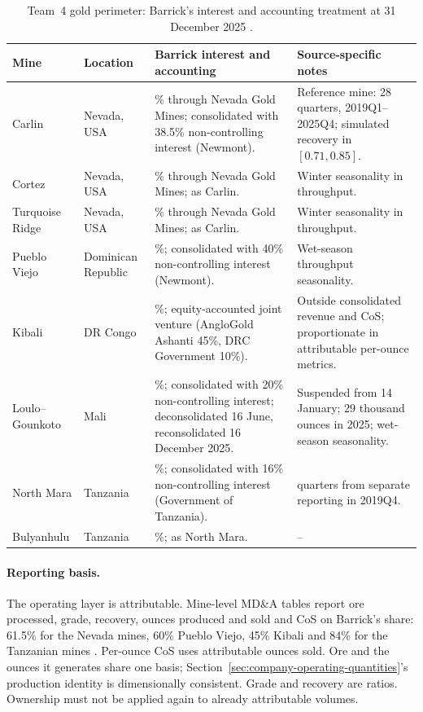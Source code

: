 \begin{table}[H]
\centering
\caption{Team~4 gold perimeter: Barrick's interest and accounting treatment
at 31 December 2025 \cite{team4,barrick-ar-2025}.}
\label{tab:company-operating-perimeter}
\small
\renewcommand{\arraystretch}{1.12}
\begin{tabularx}{\textwidth}{@{}>{\raggedright\arraybackslash}p{2.15cm}%
>{\raggedright\arraybackslash}p{1.75cm}%
>{\raggedright\arraybackslash}p{3.85cm}%
>{\raggedright\arraybackslash}X@{}}
\toprule
\textbf{Mine} & \textbf{Location} & \textbf{Barrick interest and accounting}
& \textbf{Source-specific notes} \\
\midrule
Carlin & Nevada, USA & 61.5\% through Nevada Gold Mines; consolidated with
38.5\% non-controlling interest (Newmont). & Reference mine: 28 quarters,
2019Q1--2025Q4; simulated recovery in $[0.71,0.85]$. \\
Cortez & Nevada, USA & 61.5\% through Nevada Gold Mines; as Carlin. &
Winter seasonality in throughput. \\
Turquoise Ridge & Nevada, USA & 61.5\% through Nevada Gold Mines; as Carlin. &
Winter seasonality in throughput. \\
Pueblo Viejo & Dominican Republic & 60\%; consolidated with 40\%
non-controlling interest (Newmont). & Wet-season throughput seasonality. \\
Kibali & DR Congo & 45\%; equity-accounted joint venture (AngloGold Ashanti
45\%, DRC Government 10\%). & Outside consolidated revenue and CoS;
proportionate in attributable per-ounce metrics. \\
Loulo--Gounkoto & Mali & 80\%; consolidated with 20\% non-controlling
interest; deconsolidated 16 June, reconsolidated 16 December 2025. & Suspended
from 14 January; 29 thousand ounces in 2025; wet-season seasonality. \\
North Mara & Tanzania & 84\%; consolidated with 16\% non-controlling
interest (Government of Tanzania). & 25 quarters from separate reporting
in 2019Q4. \\
Bulyanhulu & Tanzania & 84\%; as North Mara. & -- \\
\bottomrule
\end{tabularx}
\end{table}

\paragraph{Reporting basis.}
The operating layer is attributable. Mine-level MD\&A tables report ore
processed, grade, recovery, ounces produced and sold and CoS on Barrick's
share: 61.5\% for the Nevada mines, 60\% Pueblo Viejo, 45\% Kibali and
84\% for the Tanzanian mines \cite{barrick-ar-2025}. Per-ounce CoS uses
attributable ounces sold. Ore and the ounces it generates share one basis;
Section~\ref{sec:company-operating-quantities}'s production identity is
dimensionally consistent. Grade and recovery are ratios. Ownership must not
be applied again to already attributable volumes.

